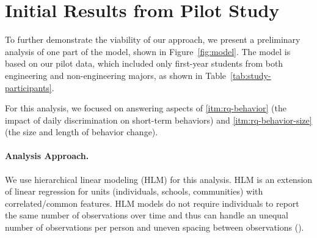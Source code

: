 \section{Initial Results from Pilot Study}
\label{sec:result}

To further demonstrate the viability of our approach, we present a preliminary analysis of one part of the model, shown in Figure~\ref{fig:model}. The model is based on our pilot data, which included only first-year students from both engineering and non-engineering majors, as shown in Table~\ref{tab:study-participants}. 

\noindent For this analysis, we focused on answering aspects of \ref{itm:rq-behavior} (the impact of daily discrimination on short-term behaviors) and \ref{itm:rq-behavior-size} (the size and length of behavior change). 

\paragraph{Analysis Approach.}
We use hierarchical linear modeling (HLM) for this analysis. HLM is an extension of linear regression for units (\eg individuals, schools, communities) with correlated/common features. %
HLM models do not require individuals to report the same number of observations over time and thus can handle an unequal number of observations per person and uneven spacing between observations (\cite{maas2005sufficient}).

